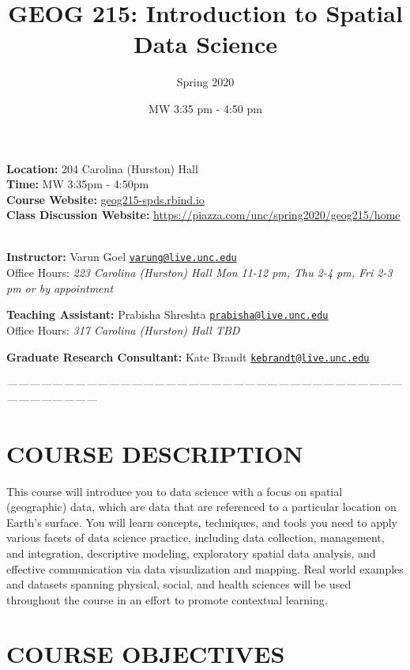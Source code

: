 \documentclass[11pt,]{article}
\title{GEOG 215: Introduction to Spatial Data Science}
\author{Spring 2020}
\date{MW 3:35 pm - 4:50 pm}
\begin{document}
\maketitle

\textbf{Location:} 204 Carolina (Hurston) Hall\\
\textbf{Time:} MW 3:35pm - 4:50pm\\
\textbf{Course Website:} \url{geog215-spds.rbind.io}\\
\textbf{Class Discussion Website:}
\url{https://piazza.com/unc/spring2020/geog215/home} ~ ~

\textbf{Instructor:} Varun Goel \textbar{}
\href{mailto:varung@live.unc.edu}{\nolinkurl{varung@live.unc.edu}}\\
Office Hours: \emph{223 Carolina (Hurston) Hall \textbar{} Mon 11-12 pm,
Thu 2-4 pm, Fri 2-3 pm or by appointment}

\textbf{Teaching Assistant:} Prabisha Shreshta \textbar{}
\href{mailto:prabisha@live.unc.edu}{\nolinkurl{prabisha@live.unc.edu}}\\
Office Hours: \emph{317 Carolina (Hurston) Hall \textbar{} TBD}

\textbf{Graduate Research Consultant:} Kate Brandt \textbar{}
\href{mailto:kebrandt@live.unc.edu}{\nolinkurl{kebrandt@live.unc.edu}}

\emph{---------------------------------------------------------------------------------------------------------------------------------}

\hypertarget{course-description}{%
\section{COURSE DESCRIPTION}\label{course-description}}

This course will introduce you to data science with a focus on spatial
(geographic) data, which are data that are referenced to a particular
location on Earth's surface. You will learn concepts, techniques, and
tools you need to apply various facets of data science practice,
including data collection, management, and integration, descriptive
modeling, exploratory spatial data analysis, and effective communication
via data visualization and mapping. Real world examples and datasets
spanning physical, social, and health sciences will be used throughout
the course in an effort to promote contextual learning.

\hypertarget{course-objectives}{%
\section{COURSE OBJECTIVES}\label{course-objectives}}
\end{document}
